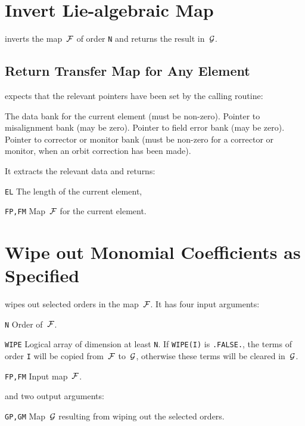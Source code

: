 \section{Invert Lie-algebraic Map}
\label{LMINV}
inverts the map~$\cal F$ of order {\tt N} and returns the result
in~$\cal G$.
                              
\subsection{Return Transfer Map for Any Element}
\label{LMMAP}
expects that the relevant pointers have been set by the calling routine:
\begin{mylist}
 The data bank for the current element (must be non-zero).
 Pointer to misalignment bank (may be zero).
 Pointer to field error bank (may be zero).
 Pointer to corrector or monitor bank
(must be non-zero for a corrector or monitor,
when an orbit correction has been made).
\end{mylist}
It extracts the relevant data and returns:
\begin{mylist}
\item[\tt EL]   The length of the current element,
\item[\tt FP,FM]Map~$\cal F$ for the current element.
\end{mylist}
 
\section{Wipe out Monomial Coefficients as Specified}
\label{LMMASK}
wipes out selected orders in the map~$\cal F$.
It has four input arguments:
\begin{mylist}
\item[\tt N]
Order of~$\cal F$.
\item[\tt WIPE]
Logical array of dimension at least {\tt N}.
If {\tt WIPE(I)} is {\tt .FALSE.},
the terms of order {\tt I} will be copied from~$\cal F$ to~$\cal G$,
otherwise these terms will be cleared in~$\cal G$.
\item[\tt FP,FM]
Input map~$\cal F$.
\end{mylist}
and two output arguments:
\begin{mylist}
\item[\tt GP,GM]
Map~$\cal G$ resulting from wiping out the selected orders.
\end{mylist}
 
